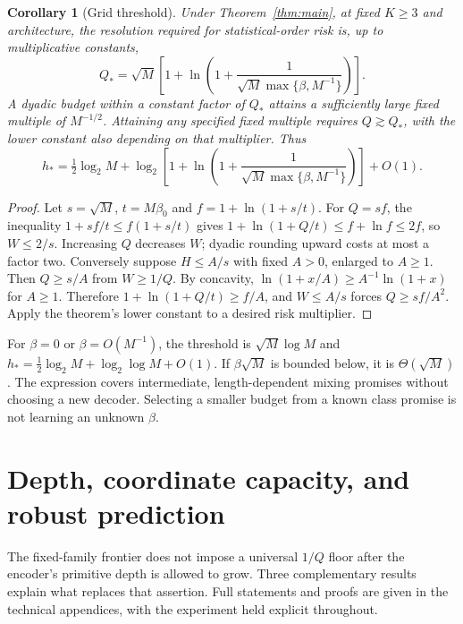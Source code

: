 \documentclass[11pt,letterpaper]{article}
\newtheorem{corollary}[theorem]{Corollary}
\theoremstyle{definition}\newtheorem{definition}[theorem]{Definition}
\theoremstyle{remark}\newtheorem{remark}[theorem]{Remark}
\newcommand{\betaz}{\beta_0}
\begin{document}
\begin{corollary}[Grid threshold]\label{cor:threshold}
Under Theorem~\ref{thm:main}, at fixed $K\ge3$ and architecture, the resolution required for statistical-order risk is, up to multiplicative constants,
\begin{equation}\label{eq:qstar}
 Q_* =\sqrt M\left[1+\ln\left(1+\frac1{\sqrt M\max\{\beta,M^{-1}\}}\right)\right].
\end{equation}
A dyadic budget within a constant factor of $Q_*$ attains a sufficiently large fixed multiple of $M^{-1/2}$. Attaining any specified fixed multiple requires $Q\gtrsim Q_*$, with the lower constant also depending on that multiplier. Thus
\[
 h_* =\tfrac12\log_2M+
 \log_2\left[1+\ln\left(1+\frac1{\sqrt M\max\{\beta,M^{-1}\}}\right)\right]+O(1).
\]
\end{corollary}
\begin{proof}
Let $s=\sqrt M$, $t=M\betaz$ and $f=1+\ln(1+s/t)$. For $Q=sf$, the inequality $1+sf/t\le f(1+s/t)$ gives $1+\ln(1+Q/t)\le f+\ln f\le2f$, so $W\le2/s$. Increasing $Q$ decreases $W$; dyadic rounding upward costs at most a factor two.
Conversely suppose $H\le A/s$ with fixed $A>0$, enlarged to $A\ge1$. Then $Q\ge s/A$ from $W\ge1/Q$. By concavity, $\ln(1+x/A)\ge A^{-1}\ln(1+x)$ for $A\ge1$. Therefore $1+\ln(1+Q/t)\ge f/A$, and $W\le A/s$ forces $Q\ge sf/A^2$. Apply the theorem's lower constant to a desired risk multiplier.
\end{proof}

For $\beta=0$ or $\beta=O(M^{-1})$, the threshold is $\sqrt M\log M$ and $h_*=\frac12\log_2M+\log_2\log M+O(1)$. If $\beta\sqrt M$ is bounded below, it is $\Theta(\sqrt M)$. The expression covers intermediate, length-dependent mixing promises without choosing a new decoder. Selecting a smaller budget from a known class promise is not learning an unknown $\beta$.

\section{Depth, coordinate capacity, and robust prediction}\label{sec:overview}
The fixed-family frontier does not impose a universal $1/Q$ floor after the encoder's primitive depth is allowed to grow. Three complementary results explain what replaces that assertion. Full statements and proofs are given in the technical appendices, with the experiment held explicit throughout.
\end{document}
